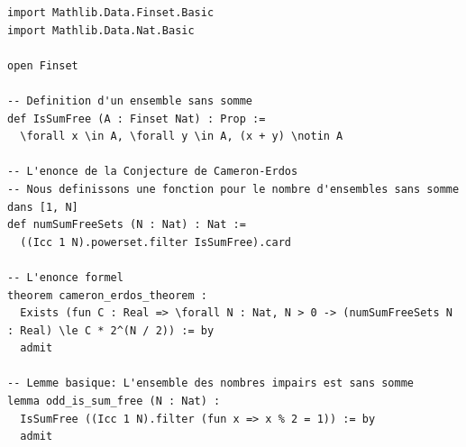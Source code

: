 \documentclass[12pt, a4paper]{article}
\begin{document}
\begin{lstlisting}[language=lean, basicstyle=\ttfamily\small, breaklines=true]
import Mathlib.Data.Finset.Basic
import Mathlib.Data.Nat.Basic

open Finset

-- Definition d'un ensemble sans somme
def IsSumFree (A : Finset Nat) : Prop :=
  \forall x \in A, \forall y \in A, (x + y) \notin A

-- L'enonce de la Conjecture de Cameron-Erdos
-- Nous definissons une fonction pour le nombre d'ensembles sans somme dans [1, N]
def numSumFreeSets (N : Nat) : Nat :=
  ((Icc 1 N).powerset.filter IsSumFree).card

-- L'enonce formel
theorem cameron_erdos_theorem :
  Exists (fun C : Real => \forall N : Nat, N > 0 -> (numSumFreeSets N : Real) \le C * 2^(N / 2)) := by
  admit

-- Lemme basique: L'ensemble des nombres impairs est sans somme
lemma odd_is_sum_free (N : Nat) :
  IsSumFree ((Icc 1 N).filter (fun x => x % 2 = 1)) := by
  admit
\end{lstlisting}
\end{document}
